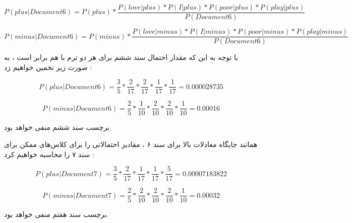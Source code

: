 \begin{boxC}
    \begin{center}
    \end{center}

    \begin{equation*}
        P(plus | Document6) = P(plus) * \frac{P(love | plus) * P(I | plus) * P(poor | plus) * P(play | plus)}{P(Document6)}
    \end{equation*}

    \begin{equation*}
        P(minus | Document6) = P(minus) * \frac{P(love | minus) * P(I | minus) * P(poor | minus) * P(play | minus)}{P(Document6)}
    \end{equation*}

    با توجه به این که مقدار احتمال سند ششم برای هر دو ترم با هم برابر است ، به صورت زیر تخمین خواهیم زد :
    
    \begin{equation*}
        P(plus | Document6) = \frac{3}{5} * \frac{2}{17} * \frac{2}{17} * \frac{1}{17} * \frac{1}{17} 
        = 0.000028735 
    \end{equation*}

    \begin{equation*}
        P(minus | Document6) = \frac{2}{5} * \frac{1}{10} * \frac{2}{10} * \frac{2}{10} * \frac{1}{10} = 
        0.00016
    \end{equation*}

    برچسب سند ششم منفی خواهد بود.
\end{boxC}

\newpage

\begin{boxC}
    \begin{center}
    \end{center}

    همانند جایگاه معادلات بالا برای سند ۶ ، مقادیر احتمالاتی را برای کلاس‌های ممکن برای سند ۷ را محاسبه خواهیم کرد :

    \begin{equation*}
        P(plus | Document7) = \frac{3}{5} * \frac{2}{17} * \frac{1}{17} * \frac{1}{17} * \frac{5}{17} = 0.00007183822
    \end{equation*}

    \begin{equation*}
        P(minus | Document7) = \frac{2}{5} * \frac{2}{10} * \frac{2}{10} * \frac{2}{10} * \frac{1}{10} = 0.00032
    \end{equation*}

    
    برچسب سند هفتم منفی خواهد بود.    
\end{boxC}

